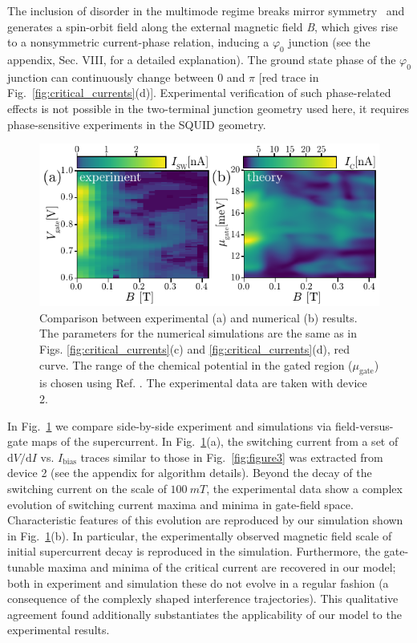 The inclusion of disorder in the multimode regime breaks mirror symmetry~\cite{Yokoyama2014,Yokoyama2014a} and generates a spin-orbit field along the external magnetic field \textit{B}, which gives rise to a nonsymmetric current-phase relation, inducing a $\varphi_0$ junction (see the appendix, Sec. VIII, for a detailed explanation).
The ground state phase of the $\varphi_0$ junction can continuously change between 0 and $\pi$ [red trace in Fig.~\ref{fig:critical_currents}(d)].
Experimental verification of such phase-related effects is not possible in the two-terminal junction geometry used here, it requires phase-sensitive experiments in the SQUID geometry.

\begin{figure}
\begin{center}
\includegraphics[width=0.7\columnwidth]{chapter_supercurrent/figures/fig5.pdf}
\caption{Comparison between experimental (a) and numerical (b) results.
The parameters for the numerical simulations are the same as in Figs. \ref{fig:critical_currents}(c) and \ref{fig:critical_currents}(d), red curve.
The range of the chemical potential in the gated region ($\mu_{\textrm{gate}}$) is chosen using Ref. \cite{Vuik2016}. The experimental data are taken with device 2.}
\label{fig:figure5}
\end{center}
\end{figure}

In Fig.~\ref{fig:figure5} we compare side-by-side experiment and simulations via field-versus-gate maps of the supercurrent.
In Fig.~\ref{fig:figure5}(a), the switching current from a set of $\mathrm{d}V/\mathrm{d}I$ vs. $I_\textrm{bias}$ traces similar to those in Fig.~\ref{fig:figure3} was extracted from device 2 (see the appendix for algorithm details).
Beyond the decay of the switching current on the scale of $\SI{100}{mT}$, the experimental data show a complex evolution of switching current maxima and minima in gate-field space.
Characteristic features of this evolution are reproduced by our simulation shown in Fig.~\ref{fig:figure5}(b).
In particular, the experimentally observed magnetic field scale of initial supercurrent decay is reproduced in the simulation.
Furthermore, the gate-tunable maxima and minima of the critical current are recovered in our model; both in experiment and simulation these do not evolve in a regular fashion (a consequence of the complexly shaped interference trajectories).
This qualitative agreement found additionally substantiates the applicability of our model to the experimental results.

